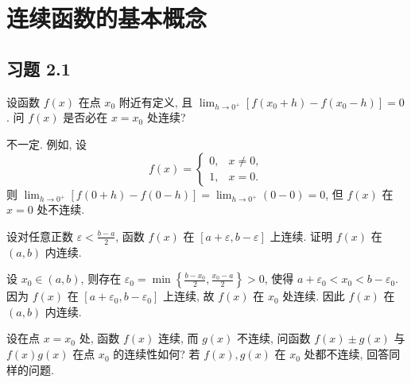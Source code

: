 \chapter{连续函数的基本概念}
\section{习题 2.1}

\begin{exercise}[2.1.1]
    设函数 $f(x)$ 在点 $x_0$ 附近有定义, 且 $\lim_{h \to 0^+} [f(x_0+h)-f(x_0-h)]=0$. 问 $f(x)$ 是否必在 $x=x_0$ 处连续?
\end{exercise}

\begin{solution}
    不一定. 例如, 设
    $$ f(x) = \begin{cases} 0, & x \ne 0, \\ 1, & x=0. \end{cases} $$
    则 $\lim_{h \to 0^+} [f(0+h)-f(0-h)] = \lim_{h \to 0^+} (0-0)=0$, 但 $f(x)$ 在 $x=0$ 处不连续.
\end{solution}

\begin{exercise}[2.1.2]
    设对任意正数 $\varepsilon < \frac{b-a}{2}$, 函数 $f(x)$ 在 $[a+\varepsilon, b-\varepsilon]$ 上连续. 证明 $f(x)$ 在 $(a,b)$ 内连续.
\end{exercise}

\begin{solution}
    设 $x_0 \in (a,b)$, 则存在 $\varepsilon_0 = \min\left\{\frac{b-x_0}{2}, \frac{x_0-a}{2}\right\}> 0$, 使得 $a+\varepsilon_0 < x_0 < b-\varepsilon_0$. 因为 $f(x)$ 在 $[a+\varepsilon_0, b-\varepsilon_0]$ 上连续, 故 $f(x)$ 在 $x_0$ 处连续. 因此 $f(x)$ 在 $(a,b)$ 内连续.
\end{solution}

\begin{exercise}[2.1.3]
    设在点 $x=x_0$ 处, 函数 $f(x)$ 连续, 而 $g(x)$ 不连续, 问函数 $f(x) \pm g(x)$ 与 $f(x)g(x)$ 在点 $x_0$ 的连续性如何? 若 $f(x), g(x)$ 在 $x_0$ 处都不连续, 回答同样的问题.
\end{exercise}

